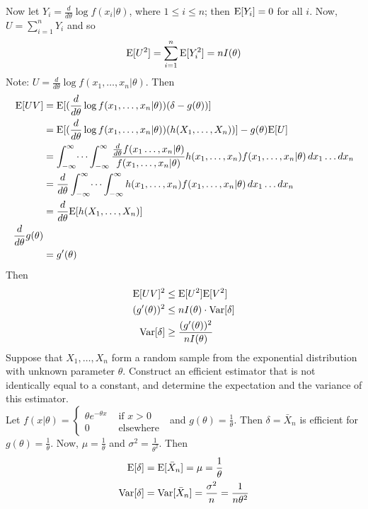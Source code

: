 \documentclass[12pt]{article}
\begin{document}
Now let $Y_i = \frac{d}{d\theta} \log f(x_i | \theta)$, where $ 1 \leq i \leq n$; then $\mathrm{E}[ Y_i ] = 0$ for all $i$. Now, $U = \sum_{i=1}^n Y_i$ and so $$\mathrm{E}[ U^2 ] = \sum_{i=1}^n \mathrm{E}[ Y_i^2 ] = nI(\theta)$$ 
Note: $U = \frac{d}{d\theta} \log f(x_1,\dots,x_n | \theta)$. Then $$ \begin{aligned} \mathrm{E}[ UV ] &= \mathrm{E}[  (\frac{d}{d\theta} \log f(x_1,\dots,x_n|\theta))(\delta - g(\theta)) ] \\ &= \mathrm{E}[  (\frac{d}{d\theta} \log f(x_1,\dots,x_n | \theta))(h(X_1,\dots,X_n)) ] - g(\theta)\mathrm{E}[ U ] \\ &= \int_{-\infty}^\infty \dots \int_{-\infty}^\infty \frac{\frac{d}{d\theta} f(x_1\dots,x_n|\theta)}{f(x_1,\dots,x_n|\theta)}  h(x_1,\dots,x_n)f(x_1,\dots,x_n|\theta) \, dx_1\dots dx_n \\&= \frac{d}{d\theta} \int_{-\infty}^\infty \dots \int_{-\infty}^\infty h(x_1,\dots,x_n)f(x_1,\dots,x_n | \theta) \, dx_1\dots dx_n \\ &= \frac{d}{d\theta} \mathrm{E}[ h(X_1,\dots,X_n) ] \\ \frac{d}{d\theta} g(\theta) \\ &= g'(\theta) \end{aligned} $$ Then $$ \begin{aligned} \mathrm{E}[ UV ]^2 &\leq \mathrm{E}[ U^2 ]\mathrm{E}[ V^2 ] \\ (g'(\theta))^2 &\leq nI(\theta) \cdot \mathrm{Var}[ \delta ] \\ \mathrm{Var}[ \delta ] &\geq \frac{(g'(\theta))^2}{nI(\theta)} \end{aligned} $$ 
Suppose that $X_1,\dots,X_n$ form a random sample from the exponential distribution with unknown parameter $\theta$. Construct an efficient estimator that is not identically equal to a constant, and determine the expectation and the variance of this estimator. \\
Let $f(x|\theta) = \begin{cases} \theta e^{-\theta x} &\text{ if } x > 0 \\ 0 &\text{ elsewhere } \end{cases} $ and $g(\theta) = \frac{1}{\theta}$. Then $\delta = \bar{X}_n$ is efficient for $g(\theta) = \frac{1}{\theta}$. Now, $\mu = \frac{1}{\theta}$ and $\sigma^2 = \frac{1}{\theta^2}$. Then $$ \begin{aligned} \mathrm{E}[ \delta ] &= \mathrm{E}[ \bar{X}_n ] = \mu = \frac{1}{\theta} \\ \mathrm{Var}[ \delta ] &= \mathrm{Var}[ \bar{X}_n ] = \frac{\sigma^2}{n} = \frac{1}{n\theta^2} \end{aligned} $$ 
\end{document}
